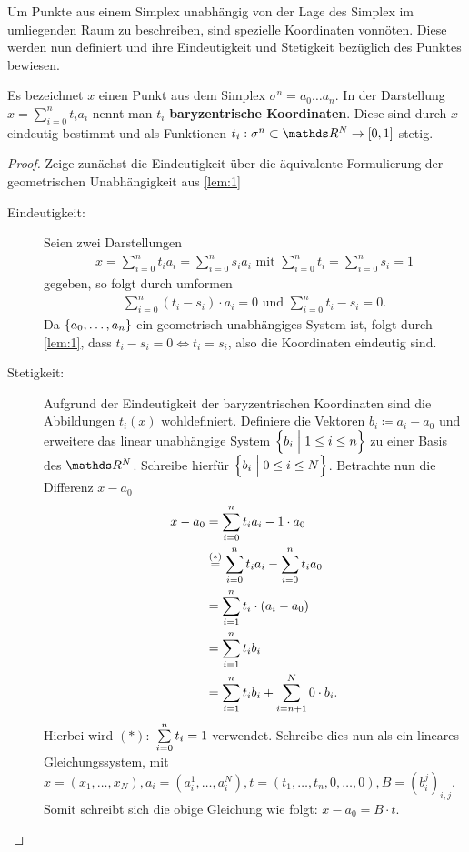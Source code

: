Um Punkte aus einem Simplex unabhängig von der Lage des Simplex im
umliegenden Raum zu beschreiben, sind spezielle Koordinaten
vonnöten. Diese werden nun definiert und ihre Eindeutigkeit und
Stetigkeit bezüglich des Punktes bewiesen.


\begin{Lem}\label{lem:bary}
  \normalfont Es bezeichnet $x$ einen Punkt aus dem Simplex
  $\sigma^n = a_0\ldots a_n$. In der Darstellung
  $x = \sum_{i=0}^n t_i a_i$ nennt man $t_i$ \textbf{baryzentrische
    Koordinaten}. Diese sind durch $x$ eindeutig bestimmt und als
  Funktionen $t_i : \sigma^n \subset \R^N \rightarrow [0,1]$ stetig.
  \pagebreak
  \begin{proof}
    Zeige zunächst die Eindeutigkeit über die äquivalente
    Formulierung der geometrischen Unabhängigkeit aus \cref{lem:1}
    \begin{description}
    \item[Eindeutigkeit: ] Seien zwei Darstellungen
      \begin{gather*}
        x = \sum\limits_{i=0}^n t_i a_i = \sum\limits_{i=0}^n s_i a_i
        \text{ mit } \sum\limits_{i=0}^n t_i = \sum\limits_{i=0}^n s_i
        = 1
      \end{gather*}
      gegeben, so folgt durch umformen
      \begin{gather*}
        \sum\limits_{i=0}^n (t_i - s_i ) \cdot a_i = 0 \text{ und }
        \sum\limits_{i=0}^n t_i - s_i = 0.
      \end{gather*}
      Da $\sset{a_0 , \ldots , a_n}$ ein geometrisch unabhängiges
      System ist, folgt durch \cref{lem:1}, dass
      $t_i - s_i = 0 \Leftrightarrow t_i = s_i$, also die Koordinaten
      eindeutig sind.
    \item[Stetigkeit: ] Aufgrund der Eindeutigkeit der baryzentrischen
      Koordinaten sind die Abbildungen $t_i (x)$ wohldefiniert.
      Definiere die Vektoren $b_i \coloneqq a_i - a_0$ und erweitere
      das linear unabhängige System $\set{ b_i }{ 1 \leq i \leq n}$ zu
      einer Basis des $\R^N$. Schreibe hierfür $\set{ b_i
      }{ 0 \leq i \leq N}$. Betrachte nun die Differenz $x - a_0$
      \begin{align*}
        x - a_0 &= \sp{0}{n} t_i a_i - 1 \cdot a_0\\
                &\overset{(*)}{=} \sp{0}{n} t_i a_i - \sp{0}{n} t_i a_0\\
                &= \sp{1}{n} t_i \cdot (a_i - a_0)\\
                &= \sp{1}{n} t_i b_i\\
                &= \sp{1}{n} t_i b_i + \sp{n+1}{N} 0 \cdot b_i.
      \end{align*}
      Hierbei wird $(*):$ $\sp{0}{n} t_i = 1$ verwendet. Schreibe dies
      nun als ein lineares Gleichungssystem, mit
      $x=(x_1,\ldots,x_N),a_i=(a_i^1,\ldots,a_i^N),%
      t=(t_1,\ldots,t_n,0,\ldots,0),B=(b_i^j)_{i,j}$.
      Somit schreibt sich die obige Gleichung wie folgt:
      $x-a_0 = B\cdot t$.
     

\end{description}
\end{proof}
\end{Lem}
